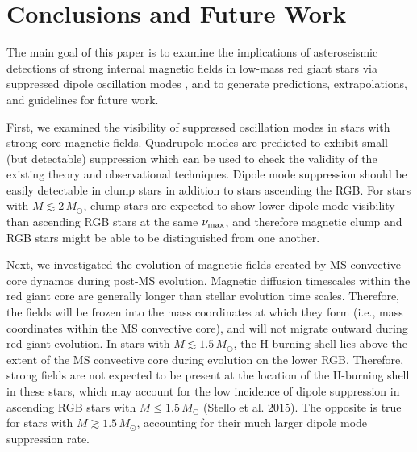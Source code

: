 \section{Conclusions and Future Work}
\label{conclusion}

The main goal of this paper is to examine the implications of asteroseismic detections of strong internal magnetic fields in low-mass red giant stars via suppressed dipole oscillation modes \citep{Fuller_2015,Stello_2016}, and to generate predictions, extrapolations, and guidelines for future work. 

First, we examined the visibility of suppressed oscillation modes in stars with strong core magnetic fields. Quadrupole modes are predicted to exhibit small (but detectable) suppression which can be used to check the validity of the existing theory and observational techniques. Dipole mode suppression should be easily detectable in clump stars in addition to stars ascending the RGB. For stars with $M \lesssim 2 \, M_\odot$, clump stars are expected to show lower dipole mode visibility than ascending RGB stars at the same $\nu_{\rm max}$, and therefore magnetic clump and RGB stars might be able to be distinguished from one another.

Next, we investigated the evolution of magnetic fields created by MS convective core dynamos during post-MS evolution. Magnetic diffusion timescales within the red giant core are generally longer than stellar evolution time scales. Therefore, the fields will be frozen into the mass coordinates at which they form (i.e., mass coordinates within the MS convective core), and will not migrate outward during red giant evolution. In stars with $M \lesssim 1.5 \, M_\odot$, the H-burning shell lies above the extent of the MS convective core during evolution on the lower RGB. Therefore, strong fields are not expected to be present at the location of the H-burning shell in these stars, which may account for the low incidence of dipole suppression in ascending RGB stars with $M \leq 1.5 \, M_\odot$ (Stello et al. 2015). The opposite is true for stars with $M \gtrsim 1.5 \, M_\odot$, accounting for their much larger dipole mode suppression rate.


